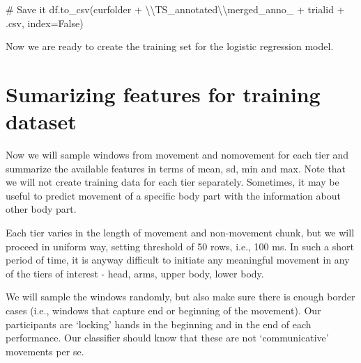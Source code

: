 \documentclass[
  letterpaper,
  DIV=11,
  numbers=noendperiod]{scrreprt}
\newenvironment{Shaded}{\begin{snugshade}}{\end{snugshade}}
\newcommand{\CharTok}[1]{\textcolor[rgb]{0.13,0.47,0.30}{#1}}
\newcommand{\CommentTok}[1]{\textcolor[rgb]{0.37,0.37,0.37}{#1}}
\newcommand{\NormalTok}[1]{\textcolor[rgb]{0.00,0.23,0.31}{#1}}
\newcommand{\OperatorTok}[1]{\textcolor[rgb]{0.37,0.37,0.37}{#1}}
\newcommand{\StringTok}[1]{\textcolor[rgb]{0.13,0.47,0.30}{#1}}
\newcommand{\VariableTok}[1]{\textcolor[rgb]{0.07,0.07,0.07}{#1}}
\begin{document}
\begin{Shaded}
\begin{Highlighting}[]
    \CommentTok{\# Save it}
\NormalTok{    df.to\_csv(curfolder }\OperatorTok{+} \StringTok{\textquotesingle{}}\CharTok{\textbackslash{}\textbackslash{}}\StringTok{TS\_annotated}\CharTok{\textbackslash{}\textbackslash{}}\StringTok{merged\_anno\_\textquotesingle{}} \OperatorTok{+}\NormalTok{ trialid }\OperatorTok{+} \StringTok{\textquotesingle{}.csv\textquotesingle{}}\NormalTok{, index}\OperatorTok{=}\VariableTok{False}\NormalTok{)}
\end{Highlighting}
\end{Shaded}

Now we are ready to create the training set for the logistic regression
model.


\chapter{Sumarizing features for training
dataset}\label{sumarizing-features-for-training-dataset}

Now we will sample windows from movement and nomovement for each tier
and summarize the available features in terms of mean, sd, min and max.
Note that we will not create training data for each tier separately.
Sometimes, it may be useful to predict movement of a specific body part
with the information about other body part.

Each tier varies in the length of movement and non-movement chunk, but
we will proceed in uniform way, setting threshold of 50 rows, i.e., 100
ms. In such a short period of time, it is anyway difficult to initiate
any meaningful movement in any of the tiers of interest - head, arms,
upper body, lower body.

We will sample the windows randomly, but also make sure there is enough
border cases (i.e., windows that capture end or beginning of the
movement). Our participants are `locking' hands in the beginning and in
the end of each performance. Our classifier should know that these are
not `communicative' movements per se.
\end{document}
